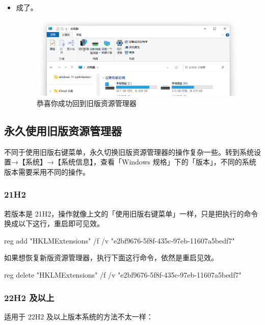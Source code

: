 \begin{itemize}
  \item 成了。
    \begin{figure}[htb!]
      \centering
      \includegraphics[width=.65\textwidth]{assets/advanced/old-explorer.png}
      \caption{恭喜你成功回到旧版资源管理器}
      \label{fig:old-explorer}
    \end{figure}
\end{itemize}

\subsection{永久使用旧版资源管理器}

不同于使用旧版右键菜单，永久切换旧版资源管理器的操作复杂一些。转到系统设置→【系统】→【系统信息】，查看「Windows 规格」下的「版本」，不同的系统版本需要采用不同的操作。

\subsubsection{21H2}

若版本是 21H2，操作就像上文的「使用旧版右键菜单」一样，只是把执行的命令换成以下这行，重启即可见效。

\begin{MissingVerbatim}
  reg add "HKLM\SOFTWARE\Microsoft\Windows\CurrentVersion\Shell Extensions\Blocked" /f /v "{e2bf9676-5f8f-435c-97eb-11607a5bedf7}"
\end{MissingVerbatim}

如果想恢复新版资源管理器，执行下面这行命令，依然是重启见效。

\begin{MissingVerbatim}
  reg delete "HKLM\SOFTWARE\Microsoft\Windows\CurrentVersion\Shell Extensions\Blocked" /f /v "{e2bf9676-5f8f-435c-97eb-11607a5bedf7}"
\end{MissingVerbatim}

\subsubsection{22H2 及以上}

适用于 22H2 及以上版本系统的方法不太一样：

